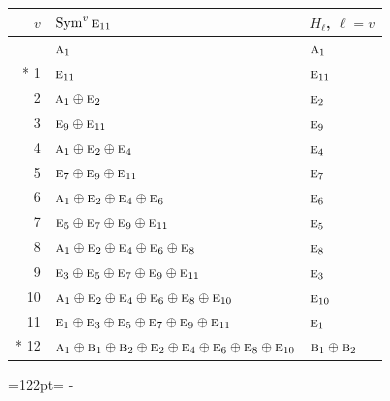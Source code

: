 \documentclass[10pt,a4paper]{article}
\newcommand{\needspace}[1]{\par\penalty-100\begingroup\dimen0=#1\relax\dimen2=\pagegoal
  \advance\dimen2-\pagetotal\ifdim\dimen0>\dimen2\relax\ifdim\dimen2>0pt\vfil\break\fi\fi
  \endgroup}
\numberwithin{equation}{section}
\newcommand{\irr}[1]{\text{\normalfont\scshape #1}}
\begin{document}
{\small\begin{longtable}{@{}rll@{}}\toprule
$v$ & $\operatorname{Sym}^{v}\irr{e}_{11}$ & $H_\ell$, $\ell = v$\\\midrule\endhead
\bottomrule\endfoot\endlastfoot
0 & $\irr{a}_{1}$ & $\irr{a}_{1}$\\*
1 & $\irr{e}_{11}$ & $\irr{e}_{11}$\\
2 & $\irr{a}_{1} \oplus \irr{e}_{2}$ & $\irr{e}_{2}$\\
3 & $\irr{e}_{9} \oplus \irr{e}_{11}$ & $\irr{e}_{9}$\\
4 & $\irr{a}_{1} \oplus \irr{e}_{2} \oplus \irr{e}_{4}$ & $\irr{e}_{4}$\\
5 & $\irr{e}_{7} \oplus \irr{e}_{9} \oplus \irr{e}_{11}$ & $\irr{e}_{7}$\\
6 & $\irr{a}_{1} \oplus \irr{e}_{2} \oplus \irr{e}_{4} \oplus \irr{e}_{6}$ & $\irr{e}_{6}$\\
7 & $\irr{e}_{5} \oplus \irr{e}_{7} \oplus \irr{e}_{9} \oplus \irr{e}_{11}$ & $\irr{e}_{5}$\\
8 & $\irr{a}_{1} \oplus \irr{e}_{2} \oplus \irr{e}_{4} \oplus \irr{e}_{6} \oplus \irr{e}_{8}$ & $\irr{e}_{8}$\\
9 & $\irr{e}_{3} \oplus \irr{e}_{5} \oplus \irr{e}_{7} \oplus \irr{e}_{9} \oplus \irr{e}_{11}$ & $\irr{e}_{3}$\\
10 & $\irr{a}_{1} \oplus \irr{e}_{2} \oplus \irr{e}_{4} \oplus \irr{e}_{6} \oplus \irr{e}_{8} \oplus \irr{e}_{10}$ & $\irr{e}_{10}$\\
11 & $\irr{e}_{1} \oplus \irr{e}_{3} \oplus \irr{e}_{5} \oplus \irr{e}_{7} \oplus \irr{e}_{9} \oplus \irr{e}_{11}$ & $\irr{e}_{1}$\\*
12 & $\irr{a}_{1} \oplus \irr{b}_{1} \oplus \irr{b}_{2} \oplus \irr{e}_{2} \oplus \irr{e}_{4} \oplus \irr{e}_{6} \oplus \irr{e}_{8} \oplus \irr{e}_{10}$ & $\irr{b}_{1} \oplus \irr{b}_{2}$\\
\bottomrule\end{longtable}}
\needspace{122pt}
\end{document}
